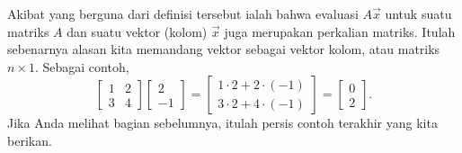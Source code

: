 Akibat yang berguna dari definisi tersebut ialah bahwa evaluasi
$A \vec{x}$ untuk suatu matriks $A$
dan suatu vektor (kolom) $\vec{x}$ juga merupakan perkalian matriks.
Itulah sebenarnya alasan kita memandang
vektor sebagai vektor kolom, atau matriks $n \times 1$.
Sebagai contoh,
\begin{equation*}
\begin{bmatrix}
1 & 2 \\ 3 & 4
\end{bmatrix}
\begin{bmatrix}
2 \\ -1
\end{bmatrix}
=
\begin{bmatrix}
1 \cdot 2 + 2 \cdot (-1) \\
3 \cdot 2 + 4 \cdot (-1)
\end{bmatrix}
=
\begin{bmatrix}
0 \\ 2
\end{bmatrix}  .
\end{equation*}
Jika Anda melihat bagian sebelumnya, itulah persis contoh terakhir
yang kita berikan.

